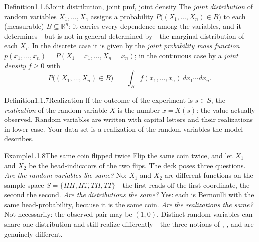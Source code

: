 \documentclass[main.tex]{subfiles}
\begin{document}
\begin{Obj}{Definition}{1.1.6}{Joint distribution, joint pmf, joint density}
The \emph{joint distribution} of random variables $X_1,\dots,X_n$ assigns a probability
$P\big((X_1,\dots,X_n)\in B\big)$ to each (measurable) $B\subseteq\mathbb{R}^n$; it carries
every dependence among the variables, and it determines---but is not in general determined
by---the marginal distribution of each $X_i$. In the discrete case it is given by the
\emph{joint probability mass function}
$p(x_1,\dots,x_n)=P(X_1=x_1,\dots,X_n=x_n)$; in the continuous case by a \emph{joint
density}
$f\ge0$ with
\[ P\big((X_1,\dots,X_n)\in B\big)\;=\;\int_B f(x_1,\dots,x_n)\,dx_1\cdots dx_n . \]
\end{Obj}

\begin{Obj}{Definition}{1.1.7}{Realization}
If the outcome of the experiment is $s\in S$, the \emph{realization} of the random variable $X$
is the number $x=X(s)$: the value actually observed. Random variables are written with capital
letters and their realizations in lower case. Your data set is a realization of the random
variables the model describes.
\end{Obj}

\begin{ObjL}{Example}{1.1.8}{The same coin flipped twice}
Flip the same coin twice, and let $X_1$ and $X_2$ be the head-indicators of the two flips. The
deck poses three questions.
\emph{Are the random variables the same?} No: $X_1$ and $X_2$ are different functions on the
sample space $S=\{HH,HT,TH,TT\}$---the first reads off the first coordinate, the second the
second.
\emph{Are the distributions the same?} Yes: each is Bernoulli with the same head-probability,
because it is the same coin.
\emph{Are the realizations the same?} Not necessarily: the observed pair may be $(1,0)$.
Distinct random variables can share one distribution and still realize differently---the three
notions of , , and  are genuinely different.
\end{ObjL}
\end{document}
